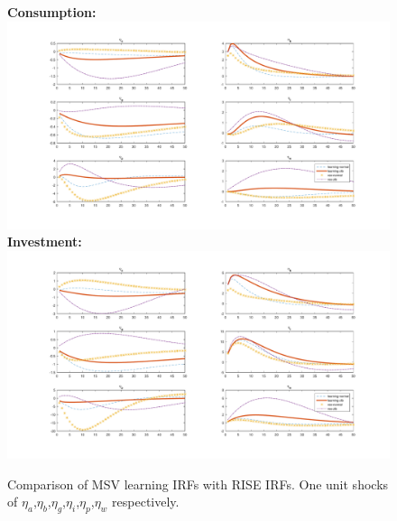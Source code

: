 \documentclass[12pt,reqno]{article}
\numberwithin{equation}{section}
\begin{document}
\begin{figure}[H]
\caption{Comparison of MSV learning IRFs with RISE IRFs. One unit shocks of $\eta_a$,$\eta_b$,$\eta_g$,$\eta_i$,$\eta_p$,$\eta_w$ respectively.}
\textbf{Consumption:}\\
\includegraphics[scale=0.5]{MSV_impresp_cons_riseComp.pdf}
\textbf{Investment:}\\
\includegraphics[scale=0.5]{MSV_impresp_inv_riseComp.pdf}

\end{figure}
\end{document}

